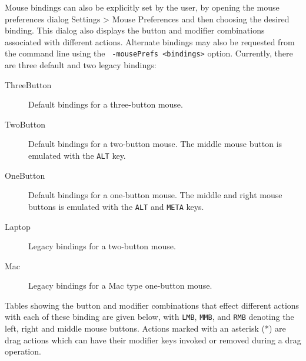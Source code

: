 \documentclass{article}
\begin{document}
Mouse bindings can also be explicitly set by the user, by opening the
mouse preferences dialog {\sf Settings > Mouse Preferences} and then
choosing the desired binding. This dialog also displays the button and
modifier combinations associated with different actions. Alternate
bindings may also be requested from the command line using the {\tt
-mousePrefs <bindings>} option. Currently, there are three default
and two legacy bindings:

\begin{description}

\item[ThreeButton]\mbox{}

Default bindings for a three-button mouse.

\item[TwoButton]\mbox{}

Default bindings for a two-button mouse. The middle mouse button
is emulated with the {\tt ALT} key.

\item[OneButton]\mbox{}

Default bindings for a one-button mouse. The middle and right mouse
buttons is emulated with the {\tt ALT} and {\tt META} keys.

\item[Laptop]\mbox{}

Legacy bindings for a two-button mouse.

\item[Mac]\mbox{}

Legacy bindings for a Mac type one-button mouse.

\end{description}

Tables showing the button and modifier combinations that effect
different actions with each of these binding are given below, with
{\tt LMB}, {\tt MMB}, and {\tt RMB} denoting the left, right and
middle mouse buttons.  Actions marked with an asterisk (*) are drag
actions which can have their modifier keys invoked or removed during a
drag operation.
\end{document}
